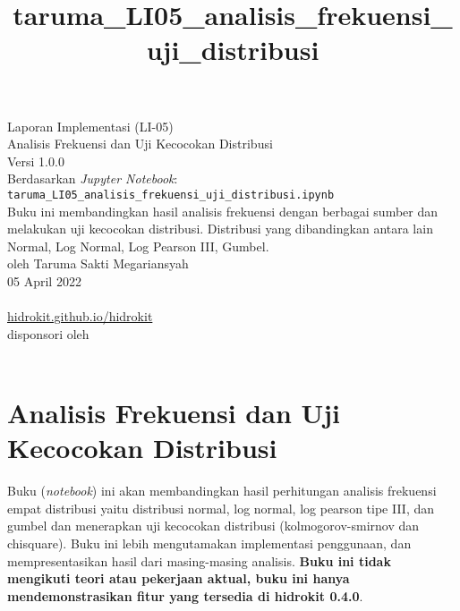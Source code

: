 \documentclass[11pt]{article}
\title{taruma\_LI05\_analisis\_frekuensi\_uji\_distribusi}
\begin{document}
    

	\begin{titlepage}
		\vspace*{\fill}
		\begin{center}
 		\normalsize Laporan Implementasi (LI-05)\\
		\huge Analisis Frekuensi dan Uji Kecocokan Distribusi \\ 
		\normalsize Versi 1.0.0 \\[0.2cm]
      	\small Berdasarkan \emph{Jupyter Notebook}: \texttt{taruma\_LI05\_analisis\_frekuensi\_uji\_distribusi.ipynb} \\[0.5cm]
      	\normalsize Buku ini membandingkan hasil analisis frekuensi dengan berbagai sumber dan melakukan uji kecocokan distribusi. Distribusi yang dibandingkan antara lain Normal, Log Normal, Log Pearson III, Gumbel. \\[0.5cm]
		\normalsize oleh Taruma Sakti Megariansyah\\[0.5cm]
      	\normalsize 05 April 2022\\[1cm]
    	\\
      	\normalsize \href{https://hidrokit.github.io/hidrokit}{hidrokit.github.io/hidrokit}  \\[0.5cm]
      	\small disponsori oleh \\[0.2cm]
    	\href{https://www.fiako.co.id}{}\\
		\end{center}
    	\vspace*{\fill}
	\end{titlepage}
    
    

    
    \hypertarget{analisis-frekuensi-dan-uji-kecocokan-distribusi}{%
\section{Analisis Frekuensi dan Uji Kecocokan
Distribusi}\label{analisis-frekuensi-dan-uji-kecocokan-distribusi}}

Buku (\emph{notebook}) ini akan membandingkan hasil perhitungan analisis
frekuensi empat distribusi yaitu distribusi normal, log normal, log
pearson tipe III, dan gumbel dan menerapkan uji kecocokan distribusi
(kolmogorov-smirnov dan chisquare). Buku ini lebih mengutamakan
implementasi penggunaan, dan mempresentasikan hasil dari masing-masing
analisis. \textbf{Buku ini tidak mengikuti teori atau pekerjaan aktual,
buku ini hanya mendemonstrasikan fitur yang tersedia di hidrokit 0.4.0}.
\end{document}
